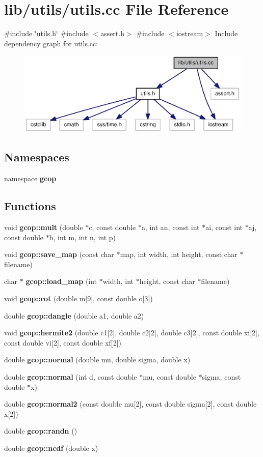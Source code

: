 \section{lib/utils/utils.cc \-File \-Reference}
\label{utils_8cc}
{\ttfamily \#include \char`\"{}utils.\-h\char`\"{}}\*
{\ttfamily \#include $<$assert.\-h$>$}\*
{\ttfamily \#include $<$iostream$>$}\*
\-Include dependency graph for utils.\-cc\-:\nopagebreak
\begin{figure}[H]
\begin{center}
\leavevmode
\includegraphics[width=350pt]{utils_8cc__incl}
\end{center}
\end{figure}
\subsection*{\-Namespaces}
\begin{DoxyCompactItemize}
\item 
namespace {\bf gcop}
\end{DoxyCompactItemize}
\subsection*{\-Functions}
\begin{DoxyCompactItemize}
\item 
void {\bf gcop\-::mult} (double $\ast$c, const double $\ast$a, int an, const int $\ast$ai, const int $\ast$aj, const double $\ast$b, int m, int n, int p)
\item 
void {\bf gcop\-::save\-\_\-map} (const char $\ast$map, int width, int height, const char $\ast$filename)
\item 
char $\ast$ {\bf gcop\-::load\-\_\-map} (int $\ast$width, int $\ast$height, const char $\ast$filename)
\item 
void {\bf gcop\-::rot} (double m[9], const double o[3])
\item 
double {\bf gcop\-::dangle} (double a1, double a2)
\item 
void {\bf gcop\-::hermite2} (double c1[2], double c2[2], double c3[2], const double xi[2], const double vi[2], const double xf[2])
\item 
double {\bf gcop\-::normal} (double mu, double sigma, double x)
\item 
double {\bf gcop\-::normal} (int d, const double $\ast$mu, const double $\ast$sigma, const double $\ast$x)
\item 
double {\bf gcop\-::normal2} (const double mu[2], const double sigma[2], const double x[2])
\item 
double {\bf gcop\-::randn} ()
\item 
double {\bf gcop\-::ncdf} (double x)
\end{DoxyCompactItemize}
